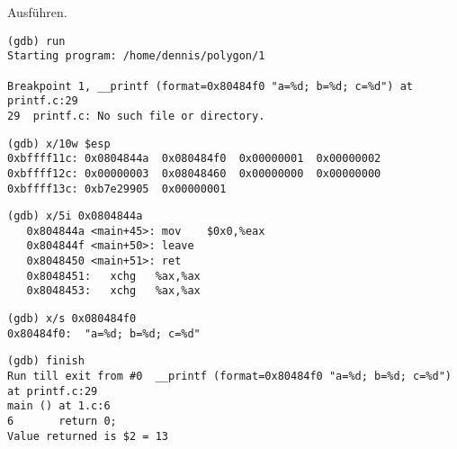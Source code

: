 Ausführen.

\begin{lstlisting}
(gdb) run
Starting program: /home/dennis/polygon/1 

Breakpoint 1, __printf (format=0x80484f0 "a=%d; b=%d; c=%d") at printf.c:29
29	printf.c: No such file or directory.
\end{lstlisting}


\begin{lstlisting}
(gdb) x/10w $esp
0xbffff11c:	0x0804844a	0x080484f0	0x00000001	0x00000002
0xbffff12c:	0x00000003	0x08048460	0x00000000	0x00000000
0xbffff13c:	0xb7e29905	0x00000001
\end{lstlisting}


\begin{lstlisting}[label=NOP_as_XCHG_example]
(gdb) x/5i 0x0804844a
   0x804844a <main+45>:	mov    $0x0,%eax
   0x804844f <main+50>:	leave  
   0x8048450 <main+51>:	ret    
   0x8048451:	xchg   %ax,%ax
   0x8048453:	xchg   %ax,%ax
\end{lstlisting}



\begin{lstlisting}
(gdb) x/s 0x080484f0
0x80484f0:	"a=%d; b=%d; c=%d"
\end{lstlisting}



\begin{lstlisting}
(gdb) finish
Run till exit from #0  __printf (format=0x80484f0 "a=%d; b=%d; c=%d") at printf.c:29
main () at 1.c:6
6		return 0;
Value returned is $2 = 13
\end{lstlisting}

